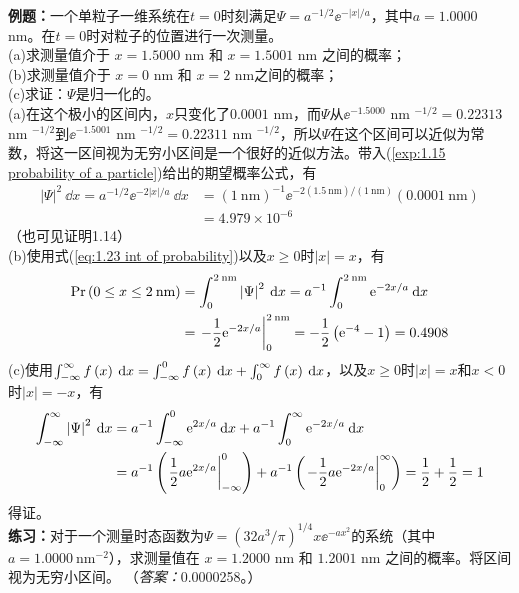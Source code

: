 	\begin{examplebox}
		\textbf{例题：}一个单粒子一维系统在$t=0$时刻满足$\Psi = a^{-1/2}\ee^{-\left|x\right|/a}$，其中$a = 1.0000$ nm。在$t=0$时对粒子的位置进行一次测量。\\
		(a)求测量值介于 $x = 1.5000$ nm 和 $x = 1.5001$ nm 之间的概率；\\
		(b)求测量值介于 $x = 0$ nm 和 $x = 2$ nm之间的概率；\\
		(c)求证：$\Psi$是归一化的。\\

		(a)在这个极小的区间内，$x$只变化了$0.0001$ nm，而$\Psi$从$\ee^{-1.5000}$ nm $^{-1/2} = 0.22313$ nm $^{-1/2}$到$\ee^{-1.5001}$ nm $^{-1/2} = 0.22311$ nm $^{-1/2}$，所以$\Psi$在这个区间可以近似为常数，将这一区间视为无穷小区间是一个很好的近似方法。带入(\ref{exp:1.15 probability of a particle})给出的期望概率公式，有
		\begin{equation*}
			\begin{aligned}
				\left|\Psi\right|^2 \:\dd x = a^{-1/2} \ee^{-2\left|x\right|/a}\:\dd x & = \left(1 \: \text{nm}\right)^{-1} \ee^{-2\left(1.5 \: \text{nm}\right)/\left(1 \:\text{nm}\right)}\left(0.0001 \:\text{nm}\right)\\
				& = 4.979 \times 10^{-6}
			\end{aligned}
		\end{equation*}	
		（也可见证明1.14）\\
		(b)使用式(\ref{eq:1.23 int of probability})以及$x \ge 0$时$\left|x\right| = x$，有
		\begin{equation*}
			\begin{aligned}
				\text{Pr} \left(0 \le x \le 2 \: \text{nm}\right) & = \int_{0}^{2 \: \text{nm}}\left|\Psi\right|^2 \:\dd x  = a^{-1} \int_{0}^{2 \: \text{nm}} \ee^{-2x/a}\:\dd x\\
				& = \eval{-\frac{1}{2}\ee^{-2x/a}}_{0}^{2 \: \text{nm}} = -\frac{1}{2}\left(\ee^{-4}-1\right) = 0.4908
			\end{aligned}
		\end{equation*}
		(c)使用$\int_{-\infty}^{\infty} f\left(x\right) \:\dd x = \int_{-\infty}^{0} f \left(x\right) \:\dd x+\int_{0}^{\infty} f\left(x\right) \:\dd x$，以及$x \ge 0$时$\left|x\right| = x$和$x < 0$时$\left|x\right| = -x$，有
		\begin{equation*}
			\begin{aligned}
				\intinf \left|\Psi\right|^2 \:\dd x  & = a ^{-1}\int_{-\infty}^{0} \ee^{2x/a}\:\dd x + a^{-1}\int_{0}^{\infty} \ee^{-2x/a}\:\dd x\\
				& = a^{-1}\left(\eval{\frac{1}{2}a\ee^{2x/a}}_{-\infty}^{0}\right) + a^{-1}\left(\eval{-\frac{1}{2}a\ee^{-2x/a}}_{0}^{\infty}\right) = \frac{1}{2} + \frac{1}{2} = 1 
			\end{aligned}
		\end{equation*}
		得证。
		\\

		\textbf{练习：}对于一个测量时态函数为$\Psi = \left(32 a^3 /\pi \right)^{1/4} x \ee^{-ax^2}$的系统（其中 $a = 1.0000 \: \text{nm}^{-2}$），求测量值在 $x = 1.2000$ nm 和 $1.2001$ nm 之间的概率。将区间视为无穷小区间。	（\textit{答案：}0.0000258。）
	\end{examplebox}
	
